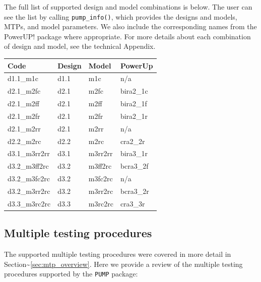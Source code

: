 \documentclass[
]{article}
\begin{document}
The full list of supported design and model combinations is below. The
user can see the list by calling \texttt{pump\_info()}, which provides
the designs and models, MTPs, and model parameters. We also include the
corresponding names from the PowerUP! package where appropriate. For
more details about each combination of design and model, see the
technical Appendix.

\begin{tabular}{l|l|l|l}
\hline
Code & Design & Model & PowerUp\\
\hline
d1.1\_m1c & d1.1 & m1c & n/a\\
\hline
d2.1\_m2fc & d2.1 & m2fc & bira2\_1c\\
\hline
d2.1\_m2ff & d2.1 & m2ff & bira2\_1f\\
\hline
d2.1\_m2fr & d2.1 & m2fr & bira2\_1r\\
\hline
d2.1\_m2rr & d2.1 & m2rr & n/a\\
\hline
d2.2\_m2rc & d2.2 & m2rc & cra2\_2r\\
\hline
d3.1\_m3rr2rr & d3.1 & m3rr2rr & bira3\_1r\\
\hline
d3.2\_m3ff2rc & d3.2 & m3ff2rc & bcra3\_2f\\
\hline
d3.2\_m3fc2rc & d3.2 & m3fc2rc & n/a\\
\hline
d3.2\_m3rr2rc & d3.2 & m3rr2rc & bcra3\_2r\\
\hline
d3.3\_m3rc2rc & d3.3 & m3rc2rc & cra3\_3r\\
\hline
\end{tabular}

\subsection{Multiple testing procedures}

The supported multiple testing procedures were covered in more detail in
Section\textasciitilde{}\ref{sec:mtp_overview}. Here we provide a review
of the multiple testing procedures supported by the \texttt{PUMP}
package:
\end{document}
